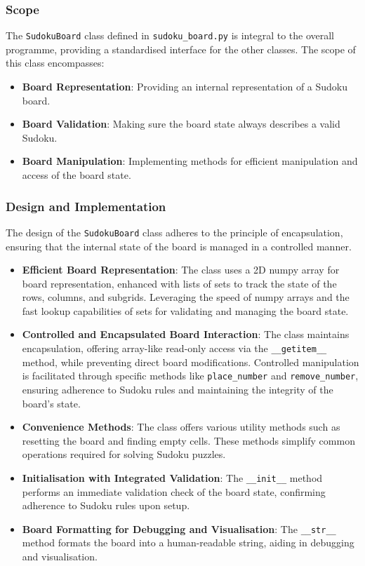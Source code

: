 \documentclass[11pt]{article}
\begin{document}
\subsubsection{Scope}
The \texttt{SudokuBoard} class defined in \texttt{sudoku\_board.py} is integral to the overall programme, providing a standardised interface for the other classes. The scope of this class encompasses:

\begin{itemize}
    \item \textbf{Board Representation}: Providing an internal representation of a Sudoku board. 
    \item \textbf{Board Validation}: Making sure the board state always describes a valid Sudoku.  
    \item \textbf{Board Manipulation}: Implementing methods for  efficient manipulation and access of the board state.
\end{itemize}
\subsubsection{Design and Implementation}
The design of the \texttt{SudokuBoard} class adheres to the principle of encapsulation, ensuring that the internal state of the board is managed in a controlled manner. 
\begin{itemize}
\item \textbf{Efficient Board Representation}: The class uses a 2D numpy array for board representation, enhanced with lists of sets to track the state of the rows, columns, and subgrids.  Leveraging the speed of numpy arrays and the fast lookup capabilities of sets for validating and managing the board state.
\item \textbf{Controlled and Encapsulated Board Interaction}: The class maintains encapsulation, offering array-like read-only access via the \texttt{\_\_getitem\_\_} method, while preventing direct board modifications. Controlled manipulation is facilitated through specific methods like \texttt{place\_number} and \texttt{remove\_number}, ensuring adherence to Sudoku rules and maintaining the integrity of the board's state.

\item \textbf{Convenience Methods}: The class offers various utility methods such as resetting the board and finding empty cells. These methods simplify common operations required for solving Sudoku puzzles.

\item \textbf{Initialisation with Integrated Validation}: The \texttt{\_\_init\_\_} method performs an immediate validation check of the board state, confirming adherence to Sudoku rules upon setup.

\item \textbf{Board Formatting for Debugging and Visualisation}: The \texttt{\_\_str\_\_} method formats the board into a human-readable string, aiding in debugging and visualisation.
\end{itemize}
\end{document}
